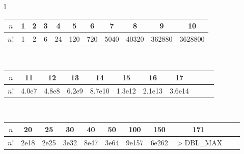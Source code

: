 \begin{center}
\begin{tabular}{l}
\begin{tabular}{c|c@{\ }c@{\ }c@{\ }c@{\ }c@{\ }c@{\ }c@{\ }c@{\ }c@{\ }c}
$n$  & 1 & 2 & 3 & 4  & 5   & 6   & 7    & 8     & 9      & 10\\
\hline
$n!$ & 1 & 2 & 6 & 24 & 120 & 720 & 5040 & 40320 & 362880 & 3628800\\
\end{tabular}\\
\begin{tabular}{c|c@{\ }c@{\ }c@{\ }c@{\ }c@{\ }c@{\ }c@{\ }c@{\ }c@{\ }c}
$n$  & 11    & 12    & 13    & 14     & 15     & 16     & 17\\
\hline
$n!$ & 4.0e7 & 4.8e8 & 6.2e9 & 8.7e10 & 1.3e12 & 2.1e13 & 3.6e14\\
\end{tabular}\\
\begin{tabular}{c|c@{\ }c@{\ }c@{\ }c@{\ }c@{\ }c@{\ }c@{\ }c@{\ }c@{\ }c}
$n$  & 20   & 25   & 30   & 40   & 50   & 100   & 150   & 171\\
\hline
$n!$ & 2e18 & 2e25 & 3e32 & 8e47 & 3e64 & 9e157 & 6e262 & \scriptsize{$>$DBL\_MAX}\\
\end{tabular}
\end{tabular}
\end{center}
